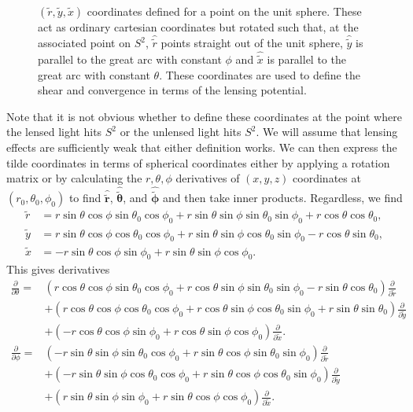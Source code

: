 \documentclass[11pt]{article} %
\begin{document}
\begin{figure}[!]
    \centering
    
    \caption{
        $(\tilde r, \tilde y, \tilde x)$ coordinates defined for a point on the unit sphere. These act as ordinary cartesian coordinates but rotated such that, at the associated point on $S^2$, $\hat{\tilde r}$ points straight out of the unit sphere, $\hat{\tilde y}$ is parallel to the great arc with constant $\phi$ and $\hat{\tilde x}$ is parallel to the great arc with constant $\theta$. These coordinates are used to define the shear and convergence in terms of the lensing potential.
        }
    \label{fig:tildecoords}
\end{figure}

Note that it is not obvious whether to define these coordinates at the point where the lensed light hits $S^2$ or the unlensed light hits $S^2$. We will assume that lensing effects are sufficiently weak that either definition works. We can then express the tilde coordinates in terms of spherical coordinates either by applying a rotation matrix or by calculating the $r, \theta, \phi$ derivatives of $(x,y,z)$ coordinates at $(r_0, \theta_0, \phi_0)$ to find $\hat{\tilde{\mathbf r}}$, $\hat{\tilde{\boldsymbol{\theta}}}$, and $\hat{\tilde{\boldsymbol{\phi}}}$ and then take inner products. Regardless, we find
\begin{align}
    \tilde r &= r\sin\theta\cos\phi\sin\theta_0\cos\phi_0+r\sin\theta\sin\phi\sin\theta_0\sin\phi_0+r\cos\theta\cos\theta_0,\\
    \tilde y &= r\sin\theta\cos\phi\cos\theta_0\cos\phi_0+r\sin\theta\sin\phi\cos\theta_0\sin\phi_0-r\cos\theta\sin\theta_0,\\
    \tilde x &= -r\sin\theta\cos\phi\sin\phi_0+r\sin\theta\sin\phi\cos\phi_0.
\end{align}
This gives derivatives
\begin{align*}
    \frac{\partial}{\partial \theta} = & \left( r \cos \theta \cos \phi \sin \theta_0 \cos \phi_0 + r \cos \theta \sin \phi \sin \theta_0 \sin \phi_0 - r \sin \theta \cos \theta_0 \right) \frac{\partial}{\partial \tilde{r}} \\
    & + \left( r \cos \theta \cos \phi \cos \theta_0 \cos \phi_0 + r \cos \theta \sin \phi \cos \theta_0 \sin \phi_0 + r \sin \theta \sin \theta_0 \right) \frac{\partial}{\partial \tilde{y}} \\
    & + \left( -r \cos \theta \cos \phi \sin \phi_0 + r \cos \theta \sin \phi \cos \phi_0 \right) \frac{\partial}{\partial \tilde{x}}.\\
    \frac{\partial}{\partial \phi} = & \left( -r \sin \theta \sin \phi \sin \theta_0 \cos \phi_0 + r \sin \theta \cos \phi \sin \theta_0 \sin \phi_0 \right) \frac{\partial}{\partial \tilde{r}} \\
& + \left( -r \sin \theta \sin \phi \cos \theta_0 \cos \phi_0 + r \sin \theta \cos \phi \cos \theta_0 \sin \phi_0 \right) \frac{\partial}{\partial \tilde{y}} \\
& + \left( r \sin \theta \sin \phi \sin \phi_0 + r \sin \theta \cos \phi \cos \phi_0 \right) \frac{\partial}{\partial \tilde{x}}.
\end{align*}
\end{document}
